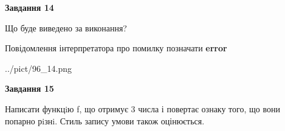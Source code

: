 \documentclass[11pt, ukrainian]{article}
\begin{document}
{\begin {large}
{\begin {center}\textbf{Завдання 14}\end {center}}\par
Що буде виведено за виконання? \par
Повідомлення інтерпретатора про помилку позначати \textbf{error}

\begin{center}
	{../pict/96_14.png}
\end{center}
\newpage

{\begin {center}\textbf{Завдання 15}\end {center}}\par

Написати функцiю f, що отримує 3 числа і повертає ознаку того, що вони попарно рiзнi. Стиль запису умови також оцінюється.\par
\newpage

\end {large}}
\end{document}
